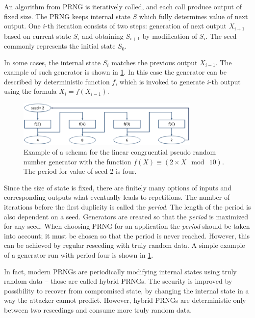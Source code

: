 \documentclass[
    digital,    %
    oneside,    %
    color,
    11pt,
    nocover,
    notable,
    nolof,
    nolot,
    final
]{fithesis3}
\renewcommand\_{\textunderscore\allowbreak}
\begin{document}
An algorithm from PRNG is iteratively called, and each call produce output of fixed size. The PRNG keeps internal state $S$ which fully determines value of next output. One $i$-th iteration consists of two steps: generation of next output $X_{i + 1}$ based on current state $S_{i}$ and obtaining $S_{i+1}$ by modification of $S_{i}$. The seed commonly represents the initial state $S_{0}$.

In some cases, the internal state $S_i$ matches the previous output $X_{i - 1}$. The example of such generator is shown in \cref{fig:prng}. In this case the generator can be described by deterministic function $f$, which is invoked to generate $i$-th output using the formula $X_i = f(X_{i - 1})$.

\begin{figure}[h]
	\centering
	\includegraphics[width=0.8\textwidth]{./images/pictures/prng.png}
	\caption{Example of a schema for the linear congruential pseudo random number generator with the function $f(X) \equiv \left(2 \times X~\bmod~10 \right)$. The period for value of seed 2 is four.}
	\label{fig:prng}
\end{figure}

Since the size of state is fixed, there are finitely many options of inputs and corresponding outputs what eventually leads to repetitions. The number of iterations before the first duplicity is called the \textit{period}. The length of the period is also dependent on a seed. Generators are created so that the \textit{period} is maximized for any seed. When choosing PRNG for an application the \textit{period} should be taken into account; it must be chosen so that the period is never reached. However, this can be achieved by regular reseeding with truly random data. A simple example of a generator run with period four is shown in \cref{fig:prng}.

In fact, modern PRNGs are periodically modifying internal states using truly random data -- those are called hybrid PRNGs. The security is improved by possibility to recover from compromised state, by changing the internal state in a way the attacker cannot predict. However, hybrid PRNGs are deterministic only between two reseedings and consume more truly random data. \cite{krhovjak2009cryptographic}
\end{document}
